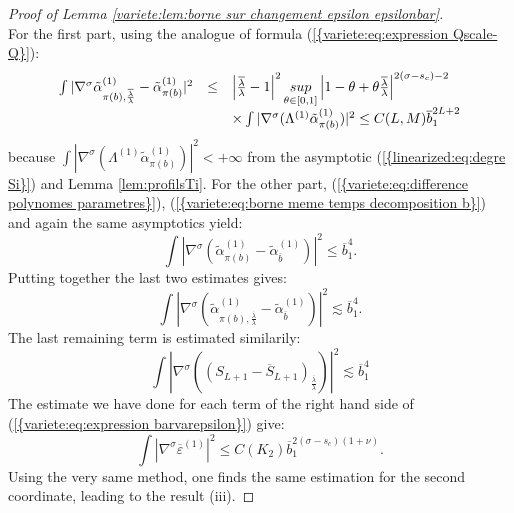 \documentclass[11pt,a4paper,reqno]{amsart}
\theoremstyle{remark}
\numberwithin{equation}{section}
\begin{document}
\begin{proof}[Proof of Lemma \ref{variete:lem:borne sur changement epsilon epsilonbar}]
$$$$
For the first part, using the analogue of formula {{\rm (\ref{{variete:eq:expression Qscale-Q}})}}:
$$
\begin{array}{r c l}
\int |\nabla^{\sigma} \tilde{\alpha}_{\pi(b),\frac{{{\overline {\lambda}}}}{\lambda}}^{(1)}-\tilde{\alpha}_{\pi(b)}^{(1)}|^2&\leq& \left|\frac{{{\overline {\lambda}}}}{\lambda}-1\right|^2 \underset{\theta\in [0,1] }{sup} \left|1-\theta+\theta\frac{{{\overline {\lambda}}}}{\lambda}\right|^{2(\sigma-s_c)-2}\\
&&\times \int |\nabla^{\sigma}(\Lambda^{(1)}\tilde{\alpha}_{\pi(b)}^{(1)})|^2\leq C(L,M){{\overline {b}}}_1^{2L+2}
\end{array}
$$
because $\int |\nabla^{\sigma}(\Lambda^{(1)}\tilde{\alpha}_{\pi(b)}^{(1)})|^2<+ \infty$ from the asymptotic {{\rm (\ref{{linearized:eq:degre Si}})}} and Lemma \ref{lem:profilsTi}. For the other part, {{\rm (\ref{{variete:eq:difference polynomes parametres}})}}, {{\rm (\ref{{variete:eq:borne meme temps decomposition b}})}} and again the same asymptotics yield:
$$
\int |\nabla^{\sigma} (\tilde{\alpha}_{\pi(b)}^{(1)}-\tilde{\alpha}_{{{\overline {b}}}}^{(1)} )|^2\leq {{\overline {b}}}_1^4.
$$
Putting together the last two estimates gives:
$$
\int |\nabla^{\sigma}(\tilde{\alpha}_{\pi(b),\frac{{{\overline {\lambda}}}}{\lambda}}^{(1)}-\tilde{\alpha}_{{{\overline {b}}}}^{(1)})|^2\lesssim {{\overline {b}}}_1^4.
$$
The last remaining term is estimated similarily:
$$
\int |\nabla^{\sigma}((S_{L+1}-\overline{S}_{L+1})_{\frac{{{\overline {\lambda}}}}{\lambda}})|^2\lesssim {{\overline {b}}}_1^4
$$
The estimate we have done for each term of the right hand side of {{\rm (\ref{{variete:eq:expression barvarepsilon}})}} give:
$$
\int |\nabla^{\sigma}{{\overline {\varepsilon}}}^{(1)}|^2\leq C(K_2) {{\overline {b}}}_1^{2(\sigma-s_c)(1+\nu)}.
$$
Using the very same method, one finds the same estimation for the second coordinate, leading to the result (iii).
\end{proof}
\end{document}
